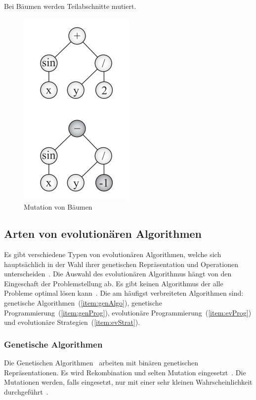         Bei Bäumen werden Teilabschnitte mutiert.
        \begin{figure}[H]
            \includegraphics[scale=0.8, center]{graphics/mutation_tree}
            \caption[\protect{}, S.29]{Mutation von Bäumen\label{fig:mutation_tree}}
        \end{figure}


  \subsection{Arten von evolutionären Algorithmen\label{sub:artenEvAlgos}}

    Es gibt verschiedene Typen von evolutionären Algorithmen, welche sich hauptsächlich in der Wahl ihrer genetischen Repräsentation
    und Operationen unterscheiden~\cite{book:introEvComp}.
    Die Auswahl des evolutionären Algorithmus hängt von den Eingeschaft der Problemstellung ab.
    Es gibt keinen Algorithmus der alle Probleme optimal lösen kann~\cite{book:genAlgoDataStructsEvProg}.
    Die am häufigst verbreiteten Algorithmen sind: genetische Algorithmen~(\vref{item:genAlgo}),
    genetische Programmierung~(\vref{item:genProg}), evolutionäre Programmierung~(\vref{item:evProg})
    und evolutionäre Strategien~(\vref{item:evStrat}).

    \subsubsection{Genetische Algorithmen\label{item:genAlgo}}

      Die Genetischen Algorithmen~\cite{book:adapNaturalArtSys} arbeiten mit binären genetischen Repräsentationen.
      Es wird Rekombination und selten Mutation eingesetzt~\cite[S.128]{book:evAlgo}.
      Die Mutationen werden, falls eingesetzt, nur mit einer sehr kleinen Wahrscheinlichkeit durchgeführt~\cite[S.128]{book:evAlgo}.

